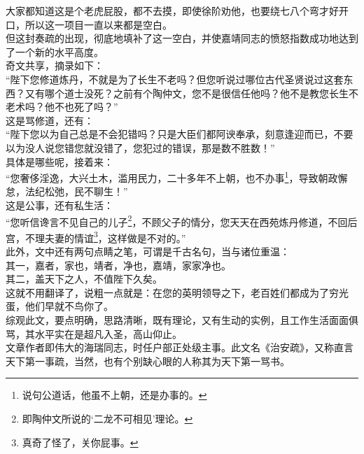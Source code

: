 \begin{multicols}{\theparacolNo}
大家都知道这是个老虎屁股，都不去摸，即使徐阶劝他，也要绕七八个弯才好开口，所以这一项目一直以来都是空白。\\

但这封奏疏的出现，彻底地填补了这一空白，并使嘉靖同志的愤怒指数成功地达到了一个新的水平高度。\\

奇文共享，摘录如下：\\

“陛下您修道炼丹，不就是为了长生不老吗？但您听说过哪位古代圣贤说过这套东西？又有哪个道士没死？之前有个陶仲文，您不是很信任他吗？他不是教您长生不老术吗？他不也死了吗？”\\

这是骂修道，还有：\\

“陛下您以为自己总是不会犯错吗？只是大臣们都阿谀奉承，刻意逢迎而已，不要以为没人说您错您就没错了，您犯过的错误，那是数不胜数！”\\

具体是哪些呢，接着来：\\

“您奢侈淫逸，大兴土木，滥用民力，二十多年不上朝，也不办事\footnote{说句公道话，他虽不上朝，还是办事的。}，导致朝政懈怠，法纪松弛，民不聊生！”\\

这是公事，还有私生活：\\

“您听信谗言不见自己的儿子\footnote{即陶仲文所说的‘二龙不可相见’理论。}，不顾父子的情分，您天天在西苑炼丹修道，不回后宫，不理夫妻的情谊\footnote{真奇了怪了，关你屁事。}，这样做是不对的。”\\

此外，文中还有两句点睛之笔，可谓是千古名句，当与诸位重温：\\

其一，嘉者，家也，靖者，净也，嘉靖，家家净也。\\

其二，盖天下之人，不值陛下久矣。\\

这就不用翻译了，说粗一点就是：在您的英明领导之下，老百姓们都成为了穷光蛋，他们早就不鸟你了。\\

综观此文，要点明确，思路清晰，既有理论，又有生动的实例，且工作生活面面俱骂，其水平实在是超凡入圣，高山仰止。\\

文章作者即伟大的海瑞同志，时任户部正处级主事。此文名《治安疏》，又称直言天下第一事疏，当然，也有个别缺心眼的人称其为天下第一骂书。\\


\end{multicols}
